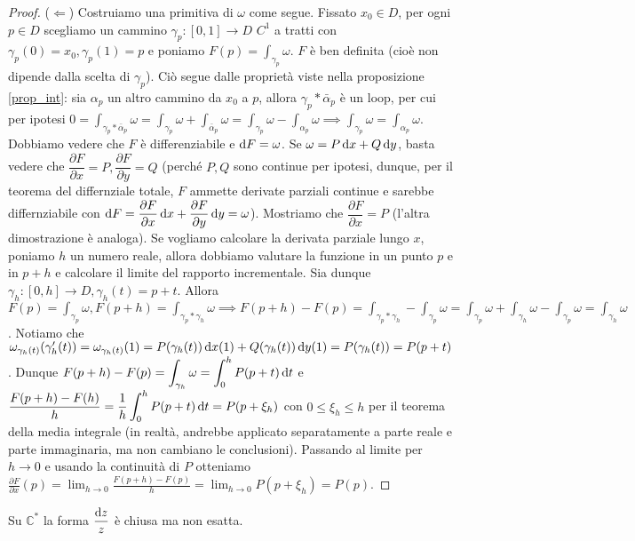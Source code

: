\begin{proof}
  ($\Leftarrow$) Costruiamo una primitiva di $\omega$ come segue. Fissato $x_0 \in D$, per ogni $p \in D$ scegliamo un cammino $\gamma_p:[0, 1] \longrightarrow D$ $C^1$ a tratti con $\gamma_p(0)=x_0, \gamma_p(1)=p$ e poniamo $\displaystyle F(p)=\int_{\gamma_p} \omega$. $F$ è ben definita (cioè non dipende dalla scelta di $\gamma_p$).
  Ciò segue dalle proprietà viste nella proposizione \ref{prop_int}: sia $\alpha_p$ un altro cammino da $x_0$ a $p$, allora $\gamma_p*\bar{\alpha}_p$ è un loop, per cui per ipotesi $\displaystyle 0=\int_{\gamma_p*\bar{\alpha}_p} \omega=\int_{\gamma_p} \omega+\int_{\bar{\alpha}_p} \omega=\int_{\gamma_p} \omega-\int_{\alpha_p} \omega \implies \int_{\gamma_p} \omega=\int_{\alpha_p} \omega$.
  Dobbiamo vedere che $F$ è differenziabile e $\mathop{}\!\mathrm{d} F=\omega$. Se $\omega=P\mathop{}\!\mathrm{d} x+Q\mathop{}\!\mathrm{d} y$, basta vedere che $\dfrac{\partial F}{\partial x}=P, \dfrac{\partial F}{\partial y}=Q$ (perché $P, Q$ sono continue per ipotesi, dunque, per il teorema del differnziale totale, $F$ ammette derivate parziali continue e sarebbe differnziabile con $\mathop{}\!\mathrm{d} F=\dfrac{\partial F}{\partial x}\mathop{}\!\mathrm{d} x+\dfrac{\partial F}{\partial y}\mathop{}\!\mathrm{d} y=\omega$).
  Mostriamo che $\dfrac{\partial F}{\partial x}=P$ (l'altra dimostrazione è analoga). Se vogliamo calcolare la derivata parziale lungo $x$, poniamo $h$ un numero reale, allora dobbiamo valutare la funzione in un punto $p$ e in $p+h$ e calcolare il limite del rapporto incrementale. Sia dunque $\gamma_h:[0, h] \longrightarrow D, \gamma_h(t)=p+t$.
  Allora $\displaystyle F(p)=\int_{\gamma_p} \omega, F(p+h)=\int_{\gamma_p*\gamma_h} \omega \implies F(p+h)-F(p)=\int_{\gamma_p*\gamma_h}-\int_{\gamma_p} \omega=\int_{\gamma_p} \omega+\int_{\gamma_h} \omega-\int_{\gamma_p} \omega=\int_{\gamma_h} \omega$.
  Notiamo che $\omega_{\gamma_h(t)}(\gamma_h'(t))=\omega_{\gamma_h(t)}(1)=P(\gamma_h(t))\mathop{}\!\mathrm{d} x(1)+Q(\gamma_h(t)) \mathop{}\!\mathrm{d} y(1)=P(\gamma_h(t))=P(p+t)$.
  Dunque $\displaystyle F(p+h)-F(p)=\int_{\gamma_h} \omega=\int_0^h P(p+t)\mathop{}\!\mathrm{d} t$ e $\displaystyle \frac{F(p+h)-F(h)}{h}=\frac{1}{h}\int_0^h P(p+t)\mathop{}\!\mathrm{d} t=P(p+\xi_h)$ con $0 \le \xi_h \le h$ per il teorema della media integrale (in realtà, andrebbe applicato separatamente a parte reale e parte immaginaria, ma non cambiano le conclusioni).
  Passando al limite per $h \longrightarrow 0$ e usando la continuità di $P$ otteniamo $\displaystyle \frac{\partial F}{\partial x}(p)=\lim_{h \longrightarrow 0} \frac{F(p+h)-F(p)}{h}=\lim_{h \longrightarrow 0} P(p+\xi_h)=P(p)$.
\end{proof}

\begin{cor}
  Su $\mathbb{C}^*$ la forma $\dfrac{\mathop{}\!\mathrm{d} z}{z}$ è chiusa ma non esatta.
\end{cor}

